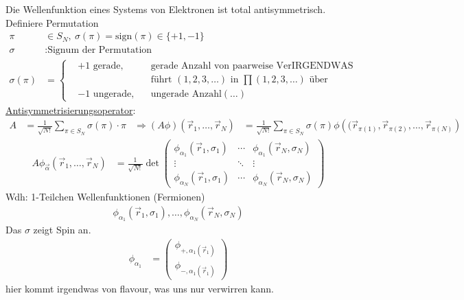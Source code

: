 Die Wellenfunktion eines Systems von Elektronen ist total antisymmetrisch. \\
Definiere Permutation
	\begin{align*}
		\pi &\in S_N ,~ \sigma (\pi) = \mathrm{sign}(\pi) \in \{+1, -1\} \\	
		\sigma &: \text{Signum der Permutation}\\
		\sigma (\pi) &=
		\left\{
			\begin{aligned}
				&+1 \text{ gerade} ,& &\text{gerade Anzahl von paarweise VerIRGENDWAS} \\
				& & &\text{führt } (1,2,3, \ldots) \text{ in } \prod (1,2,3,\ldots) \text{ über}\\
				&-1 \text{ ungerade} ,& &\text{ungerade Anzahl} (\ldots)
			\end{aligned}
		\right.
	\end{align*}
\underline{Antisymmetrisierungsoperator}:
	\begin{align*}
		A &= \frac{1}{\sqrt{N!}} \sum_{\pi \in S_N} \sigma (\pi) \cdot \pi 
		&\Rightarrow (A \phi) (\vec{r}_1, \ldots, \vec{r}_N) 
		&= \frac{1}{\sqrt{N!}} \sum_{\pi \in S_N} \sigma(\pi)
		\phi \left((\vec{r}_{\pi(1)}, \vec{r}_{\pi(2)}, \ldots ,\vec{r}_{\pi(N)}\right)   
	\end{align*}
	\begin{align*}
		A \phi_{\vec{\alpha}} (\vec{r}_1, \ldots, \vec{r}_N)
		&= \frac{1}{\sqrt{N!}} 
		\det
		\begin{pmatrix}
			\phi_{\alpha_1}(\vec{r}_1, \sigma_1) & \cdots & \phi_{\alpha_1}(\vec{r}_N, \sigma_N) \\
			\vdots & \ddots & \vdots\\
			\phi_{\alpha_N}(\vec{r}_1, \sigma_1) & \cdots & \phi_{\alpha_N}(\vec{r}_N, \sigma_N)
		\end{pmatrix}
	\end{align*}
Wdh: 1-Teilchen Wellenfunktionen (Fermionen)
	\begin{align*}
		\phi_{\alpha_1}(\vec{r}_1, \sigma_1), \ldots, \phi_{\alpha_N}(\vec{r}_N, \sigma_N)
	\end{align*}
Das $\sigma$ zeigt Spin an.
	\begin{align*}
		\phi_{\alpha_1} &= 
		\begin{pmatrix}
			\phi_{+, \alpha_1 (\vec{r}_1)} \\
			\phi_{-, \alpha_1 (\vec{r}_1)}
		\end{pmatrix}
	\end{align*}
hier kommt irgendwas von flavour, was uns nur verwirren kann.
	
